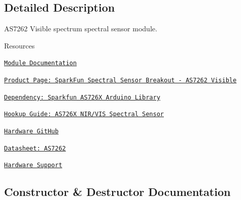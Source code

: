 \subsection{Detailed Description}
A\+S7262 Visible spectrum spectral sensor module. 

\begin{DoxyParagraph}{Resources}

\begin{DoxyItemize}
\item \href{https://openslab-osu.github.io/Loom/html/class_loom___a_s7262.html}{\tt Module Documentation}
\item \href{https://www.sparkfun.com/products/14347}{\tt Product Page\+: Spark\+Fun Spectral Sensor Breakout -\/ A\+S7262 Visible}
\item \href{https://github.com/sparkfun/Qwiic_Spectral_Sensor_AS726X/tree/master/Libraries/Arduino}{\tt Dependency\+: Sparkfun A\+S726X Arduino Library}
\item \href{https://learn.sparkfun.com/tutorials/as726x-nirvi}{\tt Hookup Guide\+: A\+S726X N\+I\+R/\+V\+IS Spectral Sensor}
\item \href{https://github.com/sparkfun/Qwiic_Spectral_Sensor_AS726X}{\tt Hardware Git\+Hub}
\item \href{https://cdn.sparkfun.com/assets/f/b/c/c/f/AS7262.pdf}{\tt Datasheet\+: A\+S7262}
\item \href{https://github.com/OPEnSLab-OSU/Loom/wiki/Hardware-Support#as7262-spectral-sensor-visible}{\tt Hardware Support} 
\end{DoxyItemize}
\end{DoxyParagraph}


\subsection{Constructor \& Destructor Documentation}
